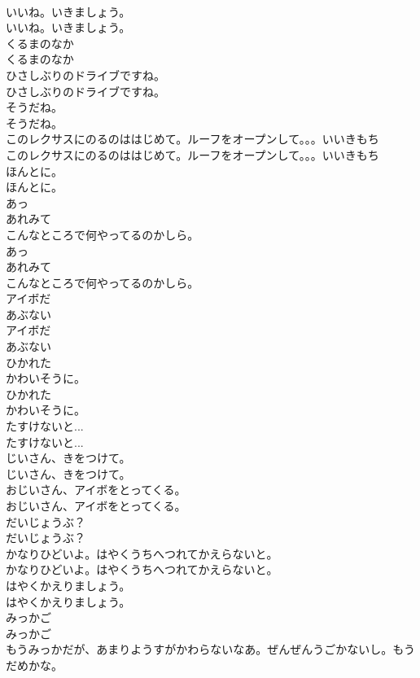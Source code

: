 \documentclass[8pt]{extreport}
\begin{document}
\begin{CJK}{UTF8}{min}
\\	いいね。いきましょう。
\\	いいね。いきましょう。
\\	くるまのなか
\\	くるまのなか
\\	ひさしぶりのドライブですね。
\\	ひさしぶりのドライブですね。
\\	そうだね。
\\	そうだね。
\\	このレクサスにのるのははじめて。ルーフをオープンして。。。いいきもち
\\	このレクサスにのるのははじめて。ルーフをオープンして。。。いいきもち
\\	ほんとに。
\\	ほんとに。
\\	あっ
\\	あれみて
\\	こんなところで何やってるのかしら。
\\	あっ
\\	あれみて
\\	こんなところで何やってるのかしら。
\\	アイボだ
\\	あぶない
\\	アイボだ
\\	あぶない
\\	ひかれた
\\	かわいそうに。
\\	ひかれた
\\	かわいそうに。
\\	たすけないと...
\\	たすけないと...
\\	じいさん、きをつけて。
\\	じいさん、きをつけて。
\\	おじいさん、アイボをとってくる。
\\	おじいさん、アイボをとってくる。
\\	だいじょうぶ？
\\	だいじょうぶ？
\\	かなりひどいよ。はやくうちへつれてかえらないと。
\\	かなりひどいよ。はやくうちへつれてかえらないと。
\\	はやくかえりましょう。
\\	はやくかえりましょう。
\\	みっかご
\\	みっかご
\\	もうみっかだが、あまりようすがかわらないなあ。ぜんぜんうごかないし。もうだめかな。

\end{CJK}
\end{document}
